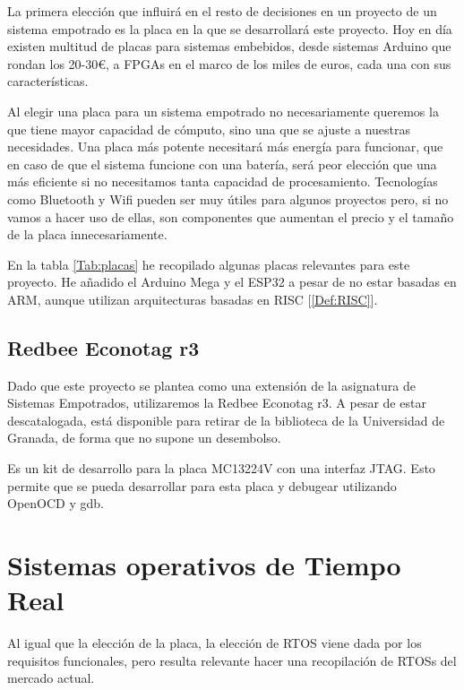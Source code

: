 La primera elección que influirá en el resto de decisiones en un proyecto de un sistema empotrado es la placa en la que se desarrollará este proyecto. Hoy en día existen multitud de placas para sistemas embebidos, desde sistemas Arduino que rondan los 20-30€, a FPGAs en el marco de los miles de euros, cada una con sus características.

Al elegir una placa para un sistema empotrado no necesariamente queremos la que tiene mayor capacidad de cómputo, sino una que se ajuste a nuestras necesidades. Una placa más potente necesitará más energía para funcionar, que en caso de que el sistema funcione con una batería, será peor elección que una más eficiente si no necesitamos tanta capacidad de procesamiento. Tecnologías como Bluetooth y Wifi pueden ser muy útiles para algunos proyectos pero, si no vamos a hacer uso de ellas, son componentes que aumentan el precio y el tamaño de la placa innecesariamente.

En la tabla \ref{Tab:placas} he recopilado algunas placas relevantes para este proyecto. He añadido el Arduino Mega y el ESP32 a pesar de no estar basadas en ARM, aunque utilizan arquitecturas basadas en RISC [\ref{Def:RISC}].



\subsection{Redbee Econotag r3}
Dado que este proyecto se plantea como una extensión de la asignatura de Sistemas Empotrados, utilizaremos la Redbee Econotag r3. A pesar de estar descatalogada, está disponible para retirar de la biblioteca de la Universidad de Granada, de forma que no supone un desembolso.

Es un kit de desarrollo para la placa MC13224V con una interfaz JTAG. Esto permite que se pueda desarrollar para esta placa y debugear utilizando OpenOCD y gdb.

\section{Sistemas operativos de Tiempo Real}

Al igual que la elección de la placa, la elección de RTOS viene dada por los requisitos funcionales, pero resulta relevante hacer una recopilación de RTOSs del mercado actual.

